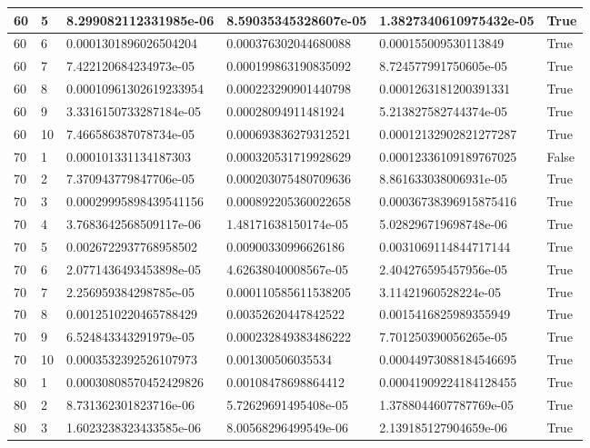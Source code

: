 \documentclass[a4paper, 12pt]{report}
\def\tabsize{4.4cm}
\def\stabsize{0.97cm}
\def\mtabsize{0.73cm}
\begin{document}
\begin{center}
\begin{longtable}{|m{\stabsize}|m{\stabsize}|m{\tabsize}|m{\tabsize}|m{\tabsize}|m{\mtabsize}|}
60 & 5 & 8.299082112331985e-06 & 8.59035345328607e-05 & 1.3827340610975432e-05 & True \\ \hline  
60 & 6 & 0.0001301896026504204 & 0.000376302044680088 & 0.000155009530113849 & True \\ \hline  
60 & 7 & 7.422120684234973e-05 & 0.000199863190835092 & 8.724577991750605e-05 & True \\ \hline  
60 & 8 & 0.00010961302619233954 & 0.000223290901440798 & 0.0001263181200391331 & True \\ \hline  
60 & 9 & 3.3316150733287184e-05 & 0.00028094911481924 & 5.213827582744374e-05 & True \\ \hline  
60 & 10 & 7.466586387078734e-05 & 0.000693836279312521 & 0.00012132902821277287 & True \\ \hline  
70 & 1 & 0.000101331134187303 & 0.000320531719928629 & 0.00012336109189767025 & False \\ \hline  
70 & 2 & 7.370943779847706e-05 & 0.000203075480709636 & 8.861633038006931e-05 & True \\ \hline  
70 & 3 & 0.00029995898439541156 & 0.000892205360022658 & 0.00036738396915875416 & True \\ \hline  
70 & 4 & 3.7683642568509117e-06 & 1.48171638150174e-05 & 5.028296719698748e-06 & True \\ \hline  
70 & 5 & 0.0026722937768958502 & 0.00900330996626186 & 0.0031069114844717144 & True \\ \hline  
70 & 6 & 2.0771436493453898e-05 & 4.62638040008567e-05 & 2.404276595457956e-05 & True \\ \hline  
70 & 7 & 2.256959384298785e-05 & 0.000110585611538205 & 3.11421960528224e-05 & True \\ \hline  
70 & 8 & 0.0012510220465788429 & 0.00352620447842522 & 0.0015416825989355949 & True \\ \hline  
70 & 9 & 6.524843343291979e-05 & 0.000232849383486222 & 7.701250390056265e-05 & True \\ \hline  
70 & 10 & 0.0003532392526107973 & 0.001300506035534 & 0.00044973088184546695 & True \\ \hline  
80 & 1 & 0.00030808570452429826 & 0.00108478698864412 & 0.00041909224184128455 & True \\ \hline  
80 & 2 & 8.731362301823716e-06 & 5.72629691495408e-05 & 1.3788044607787769e-05 & True \\ \hline  
80 & 3 & 1.6023238323433585e-06 & 8.00568296499549e-06 & 2.139185127904659e-06 & True \\ \hline  

\end{longtable}
\end{center}
\end{document}
